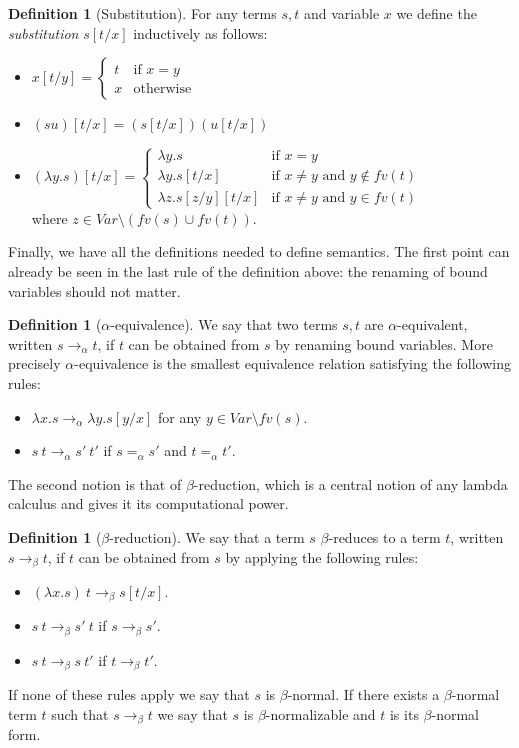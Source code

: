 \documentclass[11pt]{article}
\theoremstyle{definition}
\theoremstyle{definition}
\theoremstyle{definition}
\theoremstyle{definition}
\theoremstyle{definition}
\newtheorem{definition}[theorem]{Definition}
\theoremstyle{definition}
\theoremstyle{definition}
\newcommand{\fv}{\mathit{fv}}
\newcommand{\var}{\mathit{Var}}
\begin{document}
	\begin{definition}[Substitution]
		For any terms $s, t$ and variable $x$ we define the \emph{substitution} $s[t/x]$ inductively as follows:
		\begin{itemize}
			\item $x[t/y] =\begin{cases}
				t & \text{if } x = y\\
				x & \text{otherwise}
			\end{cases}$
			\item $(s u)[t/x] = (s[t/x])(u[t/x])$
			\item $(\lambda y. s)[t/x] = \begin{cases}
				\lambda y. s & \text{if } x = y\\
				\lambda y. s[t/x] & \text{if } x\neq y \text{ and } y\notin\fv(t)\\
				\lambda z. s[z/y][t/x] & \text{if } x\neq y \text{ and } y\in\fv(t)
			\end{cases}$ \\where $z\in \var\setminus(\fv(s)\cup\fv(t))$.
		\end{itemize}
	\end{definition}

	Finally, we have all the definitions needed to define semantics. The first point can already be seen in the last rule of the definition above: the renaming of bound variables should not matter.

	\begin{definition}[$\alpha$-equivalence]
		We say that two terms $s, t$ are $\alpha$-equivalent, written $s\to_\alpha t$, if $t$ can be obtained from $s$ by renaming bound variables. More precisely $\alpha$-equivalence is the smallest equivalence relation satisfying the following rules:
		\begin{itemize}
			\item $\lambda x. s \to_\alpha \lambda y. s[y/x]$ for any $y\in \var\setminus\fv(s)$.
			\item $s\ t \to_\alpha s'\ t'$ if $s=_\alpha s'$ and $t=_\alpha t'$.
		\end{itemize}
	\end{definition}

	The second notion is that of $\beta$-reduction, which is a central notion of any lambda calculus and gives it its computational power.

	\begin{definition}[$\beta$-reduction]
		We say that a term $s$ $\beta$-reduces to a term $t$, written $s\to_\beta t$, if $t$ can be obtained from $s$ by applying the following rules:
		\begin{itemize}
			\item $(\lambda x. s)\ t \to_\beta s[t/x]$.
			\item $s\ t \to_\beta s'\ t$ if $s\to_\beta s'$.
			\item $s\ t \to_\beta s\ t'$ if $t\to_\beta t'$.
		\end{itemize}
		If none of these rules apply we say that $s$ is $\beta$-normal. If there exists a $\beta$-normal term $t$ such that $s\to_\beta t$ we say that $s$ is $\beta$-normalizable and $t$ is its $\beta$-normal form.
	\end{definition}
\end{document}
